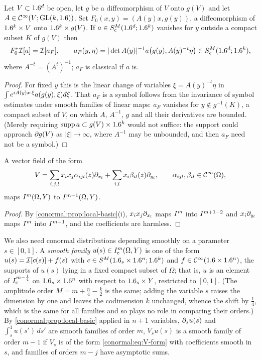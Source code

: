 \begin{lemma}\label{conormal:lem:fibre-linear}
  Let $V\subset1.6^d$ be open, let $g$ be a diffeomorphism of $V$ onto $g(V)$
  and let $A\in\mathcal{C}^\infty(V;\operatorname{GL}(k,1.6))$.  Set $F_0(x,y)=(A(y)x,g(y))$, a diffeomorphism
  of $1.6^k\times V$ onto $1.6^k\times g(V)$.  If $a\in S^M_{\mathrm c}(1.6^d;1.6^k)$
  vanishes for $y$ outside a compact subset $K$ of $g(V)$ then
  \begin{equation*}
    F_0^*\mathcal{I}[a]=\mathcal{I}[a_{F}],\qquad
    a_{F}(y,\eta)=|\det A(y)|^{-1}a\big(g(y),A(y)^{-t}\eta\big)
    \in S^M_{\mathrm c}(1.6^d;1.6^k),
  \end{equation*}
  where $A^{-t}=(A^t)^{-1}$; $a_F$ is classical if $a$ is.
\end{lemma}
\begin{proof}
  For fixed $y$ this is the linear change of variables
  $\xi=A(y)^{-t}\eta$ in $\int e^{iA(y)x\cdot\xi}a(g(y),\xi)\,\dbar\xi$.  That
  $a_F$ is a symbol follows from the invariance of symbol estimates under
  smooth families of linear maps: $a_F$ vanishes for $y\notin g^{-1}(K)$, a
  compact subset of $V$, on which $A$, $A^{-1}$, $g$ and all their
  derivatives are bounded.  (Merely requiring $\operatorname{supp} a\subset g(V)\times1.6^k$
  would not suffice: the support could approach $\partial g(V)$ as
  $|\xi|\to\infty$, where $A^{-1}$ may be unbounded, and then $a_F$ need not
  be a symbol.)
\end{proof}

\begin{lemma}\label{conormal:lem:tangent-lower}
  A vector field of the form
  \begin{equation}\label{conormal:eq:V-form}
    V=\sum_{i,j,l}x_ix_j\alpha_{ijl}(z)\partial_{x_l}+\sum_{i,l}x_i\beta_{il}(z)\partial_{y_l},
    \qquad\alpha_{ijl},\beta_{il}\in\mathcal{C}^\infty(\Omega),
  \end{equation}
  maps $I^{m}(\Omega,Y)$ to $I^{m-1}(\Omega,Y)$.
\end{lemma}
\begin{proof}
  By \cref{conormal:prop:local-basic}(i), $x_ix_j\partial_{x_l}$ maps $I^{m}$ into
  $I^{m+1-2}$ and $x_i\partial_{y_l}$ maps $I^{m}$ into $I^{m-1}$, and the
  coefficients are harmless.
\end{proof}

We also need conormal distributions depending smoothly on a parameter
$s\in[0,1]$.  A \emph{smooth family} $u(s)\in I^{m}_{\mathrm c}(\Omega,Y)$ is
one of the form $u(s)=\mathcal{I}[c(s)]+f(s)$ with $c\in S^M(1.6_s\times1.6^n;1.6^k)$
and $f\in\mathcal{C}^\infty(1.6\times1.6^n)$, the supports of $u(s)$ lying in a fixed compact
subset of $\Omega$; that is, $u$ is an element of $I^{m-\frac14}_{\mathrm c}$ on
$1.6_s\times1.6^n$ with respect to $1.6_s\times Y$, restricted to $[0,1]$. (The
amplitude order $M=m+\frac n4-\frac k2$ is the same; adding the variable $s$
raises the dimension by one and leaves the codimension $k$ unchanged, whence
the shift by $\frac14$, which is the same for all families and so plays no
role in comparing their orders.)  By
\cref{conormal:prop:local-basic} applied in $n+1$ variables, $\partial_su(s)$ and
$\int_s^1u(s')\,ds'$ are smooth families of order $m$, $V_su(s)$ is a smooth
family of order $m-1$ if $V_s$ is of the form \eqref{conormal:eq:V-form} with
coefficients smooth in $s$, and families of orders $m-j$ have asymptotic sums.

